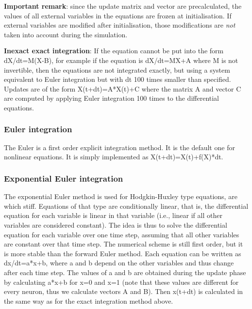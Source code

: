 \documentclass[letterpaper,10pt,english]{manual}
\begin{document}
\textbf{Important remark}: since the update matrix and vector are precalculated,
the values of all external variables in the equations are frozen at
initialisation. If external variables are modified after initialisation,
those modifications are \emph{not} taken into account during the simulation.

\textbf{Inexact exact integration}: If the equation cannot be put into the form dX/dt=M(X-B),
for example if the equation is dX/dt=MX+A where M is not invertible, then the equations
are not integrated exactly, but using a system equivalent to Euler integration but with
dt 100 times smaller than specified. Updates are of the form X(t+dt)=A*X(t)+C where the
matrix A and vector C are computed by applying Euler integration 100 times to the
differential equations.

\subsubsection{Euler integration}

The Euler is a first order explicit integration method. It is the default one for
nonlinear equations. It is simply implemented as X(t+dt)=X(t)+f(X)*dt.

\subsubsection{Exponential Euler integration}

The exponential Euler method is used for Hodgkin-Huxley type
equations, are which stiff.
Equations of that type are conditionally linear, that is, the differential equation
for each variable is linear in that variable (i.e., linear if all other variables
are considered constant).
The idea is thus to solve the differential equation for each variable over one time step,
assuming that all other variables are constant over that time step. The numerical scheme
is still first order, but it is more stable than the forward Euler method.
Each equation can be written as dx/dt=a*x+b, where a and b depend on the other variables
and thus change after each time step.
The values of a and b are obtained during the update phase by calculating a*x+b for x=0 and x=1
(note that these values are different for every neuron, thus we calculate vectors A and B).
Then x(t+dt) is calculated in the same way as for the exact integration method above.
\end{document}
